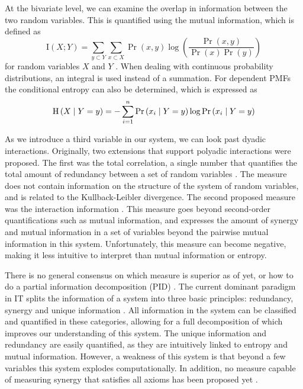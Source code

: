 \documentclass[../main.tex]{subfiles}
\begin{document}
At the bivariate level, we can examine the overlap in information between the two random variables.
This is quantified using the mutual information, which is defined as
%
\begin{equation}
\label{MI}
\mathrm{I} \left( X;Y \right) = \sum_{y \subset Y} \sum_{x \subset X} \Pr \left( x,y \right) \log (\frac{\Pr \left( x,y \right) }{\Pr \left( x \right) \Pr \left( y \right)})
\end{equation}
%
for random variables $X$ and $Y$ \cite{cover2012elements}.
When dealing with continuous probability distributions, an integral is used instead of a summation.
For dependent PMFs the conditional entropy can also be determined, which is expressed as
%
\begin{equation}
\mathrm{H} \left(X \;\middle|\; Y = y \right) = -\sum^n_{i=1} \Pr \left( x_i \;\middle|\; Y = y \right) \log \Pr \left( x_i \;\middle|\; Y = y \right)
\end{equation}
%

As we introduce a third variable in our system, we can look past dyadic interactions.
Originally, two extensions that support polyadic interactions were proposed.
The first was the total correlation, a single number that quantifies the total amount of redundancy between a set of random variables \cite{watanabe1960information}.
The measure does not contain information on the structure of the system of random variables, and is related to the Kullback-Leibler divergence.
The second proposed measure was the interaction information \cite{mcgill1954multivariate}.
This measure goes beyond second-order quantifications such as mutual information, and expresses the amount of synergy and mutual information in a set of variables beyond the pairwise mutual information in this system.
Unfortunately, this measure can become negative, making it less intuitive to interpret than mutual information or entropy.

There is no general consensus on which measure is superior as of yet, or how to do a partial information decomposition (PID) \cite{griffith2011quantifying, williams2010nonnegative}.
The current dominant paradigm in IT splits the information of a system into three basic principles: redundancy, synergy and unique information \cite{williams2010nonnegative}.
All information in the system can be classified and quantified in these categories, allowing for a full decomposition of which improves our understanding of this system.
The unique information and redundancy are easily quantified, as they are intuitively linked to entropy and mutual information.
However, a weakness of this system is that beyond a few variables this system explodes computationally.
In addition, no measure capable of measuring synergy that satisfies all axioms has been proposed yet \cite{griffith2011quantifying}.
\end{document}
